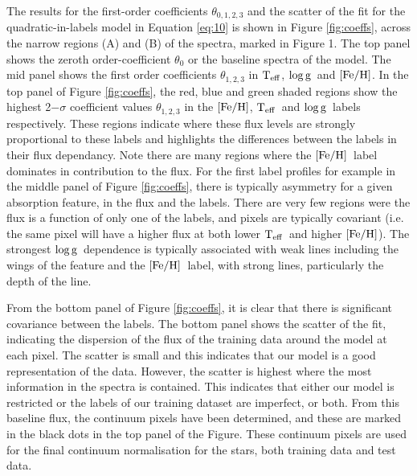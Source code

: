 \documentclass[12pt, preprint]{aastex}
\newcommand{\teff}{\mbox{$\rm T_{eff}$}}
\newcommand{\feh}{\mbox{$\rm [Fe/H]$}}
\newcommand{\logg}{\mbox{$\rm \log g$}}
\begin{document}
The results for the first-order coefficients $\theta_{0,1,2,3}$ and the scatter of the fit for the quadratic-in-labels model in Equation \ref{eq:10} is shown in Figure \ref{fig:coeffs}, across the narrow regions (A) and (B) of the spectra, marked in Figure 1. The top panel shows the zeroth order-coefficient $\theta_0$ or the baseline spectra of the model. The mid panel shows the first order coefficients $\theta_{1,2,3}$ in \teff, \logg\ and \feh. In the top panel of Figure \ref{fig:coeffs}, the red, blue and green shaded regions show the highest 2$-\sigma$ coefficient values $\theta_{1,2,3}$ in the \feh, \teff\ and \logg\ labels respectively. These regions indicate where these flux levels are strongly proportional to these labels and highlights the differences between the labels in their flux dependancy. Note there are many regions where the \feh\ label dominates in contribution to the flux. For the first label profiles for example in the middle panel of Figure \ref{fig:coeffs}, there is typically asymmetry for a given absorption feature, in the flux and the labels. There are very few regions were the flux is a function of only one of the labels, and pixels are typically covariant (i.e. the same pixel will have a higher flux at both lower \teff\ and higher \feh). The strongest \logg\ dependence is typically associated with weak lines including the wings of the feature and the \feh\ label, with strong lines, particularly the depth of the line. 

From the bottom panel of Figure \ref{fig:coeffs}, it is clear that there is significant covariance between the labels. The bottom panel shows the scatter of the fit, indicating the dispersion of the flux of the training data around the model at each pixel. The scatter is small and this indicates that our model is a good representation of the data. However, the scatter is highest where the most information in the spectra is contained. This indicates that either our model is restricted or the labels of our training dataset are imperfect, or both. From this baseline flux, the continuum pixels have been determined, and these are marked in the black dots in the top panel of the Figure. These continuum pixels are used for the final continuum normalisation for the stars, both training data and test data. 

\end{document}
